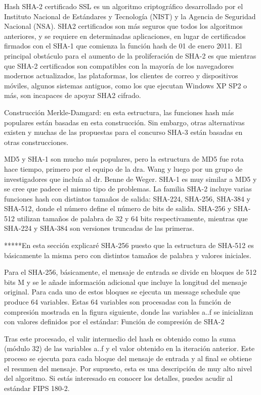 \documentclass[spanish]{article}
\begin{document}
Hash SHA-2 certificado SSL es un algoritmo criptográfico desarrollado por el Instituto Nacional de Estándares y Tecnología (NIST) y la Agencia de Seguridad Nacional (NSA). SHA2 certificados son más seguros que todos los algoritmos anteriores, y se requiere en determinadas aplicaciones, en lugar de certificados firmados con el SHA-1 que comienza la función hash de 01 de enero 2011.
El principal obstáculo para el aumento de la proliferación de SHA-2 es que mientras que SHA-2 certificados son compatibles con la mayoría de los navegadores modernos actualizados, las plataformas, los clientes de correo y dispositivos móviles, algunos sistemas antiguos, como los que ejecutan Windows XP SP2 o más, son incapaces de apoyar SHA2 cifrado.


Construcción Merkle-Damgard: en esta estructura, las funciones hash más populares están basadas en esta construcción. Sin embargo, otras alternativas existen y muchas de las propuestas para el concurso SHA-3 están basadas en otras construcciones.

MD5 y SHA-1 son mucho más populares, pero la estructura de MD5 fue rota hace tiempo, primero por el equipo de la dra. Wang y luego por un grupo de investigadores que incluía al dr. Benne de Weger. SHA-1 es muy similar a MD5 y se cree que padece el mismo tipo de problemas. La familia SHA-2 incluye varias funciones hash con distintos tamaños de salida: SHA-224, SHA-256, SHA-384 y SHA-512, donde el número define el número de bits de salida.
SHA-256 y SHA-512 utilizan tamaños de palabra de 32 y 64 bits respectivamente, mientras que SHA-224 y SHA-384 son versiones truncadas de las primeras. 

*****En esta sección explicaré SHA-256 puesto que la estructura de SHA-512 es básicamente la misma pero con distintos tamaños de palabra y valores iniciales.

Para el SHA-256, básicamente, el mensaje de entrada se divide en bloques de 512 bits M y se le añade información adicional que incluye la longitud del mensaje original. Para cada uno de estos bloques se ejecuta un message schedule que produce 64 variables. Estas 64 variables son procesadas con la función de compresión mostrada en la figura siguiente, donde las variables a..f se inicializan con valores definidos por el estándar:
Función de compresión de SHA-2

Tras este procesado, el valir intermedio del hash es obtenido como la suma (módulo 32) de las variables a..f y el valor obtenido en la iteración anterior. Este proceso se ejecuta para cada bloque del mensaje de entrada y al final se obtiene el resumen del mensaje.
Por supuesto, esta es una descripción de muy alto nivel del algoritmo. Si estás interesado en conocer los detalles, puedes acudir al estándar FIPS 180-2.
\end{document}
